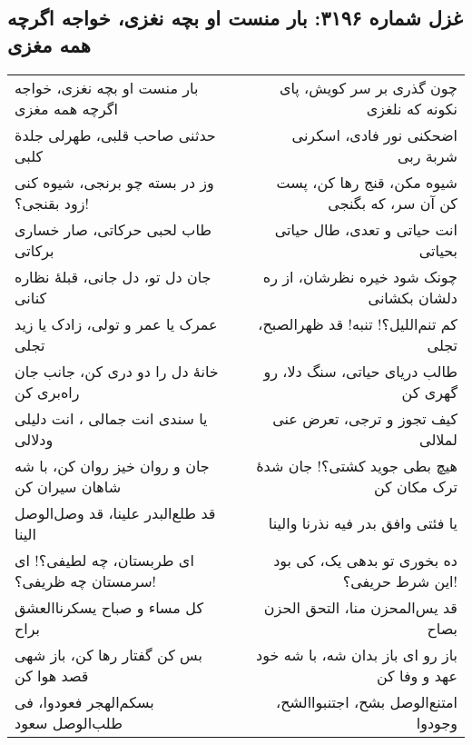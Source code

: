 \begin{center}
\section*{غزل شماره ۳۱۹۶: بار منست او بچه نغزی، خواجه اگرچه همه مغزی}
\label{sec:3196}
\begin{longtable}{l p{0.5cm} r}
بار منست او بچه نغزی، خواجه اگرچه همه مغزی
&&
چون گذری بر سر کویش، پای نکونه که نلغزی
\\
حدثنی صاحب قلبی، طهرلی جلدة کلبی
&&
اضحکنی نور فادی، اسکرنی شربة ربی
\\
وز در بسته چو برنجی، شیوه کنی زود بقنجی؟!
&&
شیوه مکن، قنج رها کن، پست کن آن سر، که بگنجی
\\
طاب لحبی حرکاتی، صار خساری برکاتی
&&
انت حیاتی و تعدی، طال حیاتی بحیاتی
\\
جان دل تو، دل جانی، قبلهٔ نظاره کنانی
&&
چونک شود خیره نظرشان، از ره دلشان بکشانی
\\
عمرک یا عمر و تولی، زادک یا زید تجلی
&&
کم تنم‌اللیل؟! تنبه! قد ظهرالصبح، تجلی
\\
خانهٔ دل را دو دری کن، جانب جان راه‌بری کن
&&
طالب دریای حیاتی، سنگ دلا، رو گهری کن
\\
یا سندی انت جمالی ، انت دلیلی ودلالی
&&
کیف تجوز و ترجی، تعرض عنی لملالی
\\
جان و روان خیز روان کن، با شه شاهان سیران کن
&&
هیچ بطی جوید کشتی؟! جان شدهٔ ترک مکان کن
\\
قد طلع‌البدر علینا، قد وصل‌الوصل الینا
&&
یا فئتی وافق بدر فیه نذرنا والینا
\\
ای طربستان، چه لطیفی؟! ای سرمستان چه ظریفی؟!
&&
ده بخوری تو بدهی یک، کی بود این شرط حریفی؟!
\\
کل مساء و صباح یسکرناالعشق براح
&&
قد یس‌المحزن منا، التحق الحزن بصاح
\\
بس کن گفتار رها کن، باز شهی قصد هوا کن
&&
باز رو ای باز بدان شه، با شه خود عهد و وفا کن
\\
بسکم‌الهجر فعودوا، فی طلب‌الوصل سعود
&&
امتنع‌الوصل بشح، اجتنبواالشح، وجودوا
\\
\end{longtable}
\end{center}
